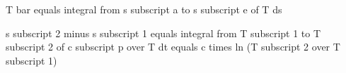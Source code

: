 T bar equals integral from s subscript a to s subscript e of T ds

s subscript 2 minus s subscript 1 equals integral from T subscript 1 to T subscript 2 of c subscript p over T dt  
equals c times ln (T subscript 2 over T subscript 1)